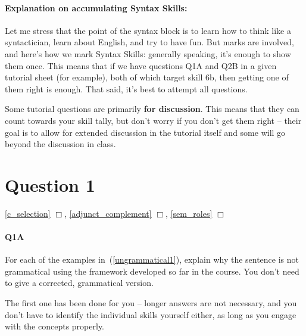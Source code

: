 \documentclass{article}
\begin{document}
\maketitle
\subtitle{Tutorial Notes Week 6: Topics 4, 5 \& 6}

\paragraph{Explanation on accumulating Syntax Skills:} Let me stress that the point of the syntax block is to learn how to think like a syntactician, learn about English, and try to have fun. But marks are involved, and here's how we mark Syntax Skills: generally speaking, it's enough to show them once. This means that if we have questions Q1A and Q2B in a given tutorial sheet (for example), both of which target skill 6b, then getting one of them right is enough. That said, it's best to attempt all questions.

Some tutorial questions are primarily \textbf{for discussion}. This means that they can count towards your skill tally, but don't worry if you don't get them right -- their goal is to allow for extended discussion in the tutorial itself and some will go beyond the discussion in class.

\section*{Question 1}
\hfill{} \ref{c_selection} $\Box$, \ref{adjunct_complement} $\Box$, \ref{sem_roles} $\Box$

\paragraph{Q1A} For each of the examples in~(\ref{ungrammatical1}), explain why the sentence is not grammatical using the framework developed so far in the course. You don't need to give a corrected, grammatical version.

The first one has been done for you -- longer answers are not necessary, and you don't have to identify the individual skills yourself either, as long as you engage with the concepts properly.
\end{document}
